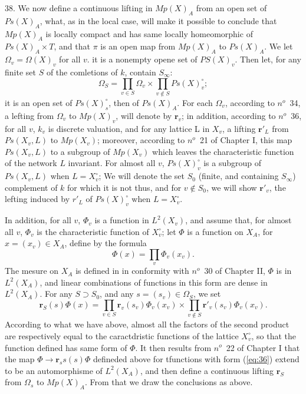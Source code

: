 \documentclass[12pt]{amsart}
\def\br{{\mathbf{r}}}
\newcounter{ssection}
\renewcommand{\subsection}{
  \addtocounter{ssection}{1}{\bf  \arabic{ssection}.\  }}
\begin{document}
\subsection{}
38.  We now define a continuous lifting in $Mp(X)_A$ from an open set of 
$Ps(X)_A$,
what, as in the local case, will make it possible to conclude that $Mp(X)_A$ 
is locally compact and has same locally homeomorphic of $Ps(X)_A \times T$,
and that $\pi$ is 
an open map from $Mp(X)_A$ to  $Ps(X)_A$.
We let $\Omega_v = \Omega(X)_v$ for all $v$. 
it is a nonempty opene set of $PS(X)_v$. Then let, for any finite set $S$ of
the comletions of $k$, contain $S_\infty$:
\[
\Omega_S=\prod_{v\in S} \Omega_v \times \prod_{v\notin S} Ps(X)_v^\circ;
\] 
it is an open set of $Ps(X)_s^\circ$, then of $Ps(X)_A$. For each $\Omega_v$, 
according to $n^o$~34, a lefting from $\Omega_v$ to $Mp(X)_v$, will denote by 
$\br_v$; in addition, according to $n^o$~36, for all $v$, $k_v$ is discrete valuation, and for any lattice L in $X_v$, a lifting $\br'_L$ from $Ps(X_v,L)$ to
$Mp(X_v)$; moreover, according to $n^o$~21 of Chapter I, 
this map $Ps(X_v, L)$ to a subgroup of $Mp(X_v)$ which leaves 
the characteristic function of the network $L$ invariant.
For almost all $v$, $Ps(X)_v^\circ$ is a subgroup of $Ps(X_v,L)$
 when $L =X_v^\circ$; We will denote the set $S_0$ 
(finite, and containing $S_\infty$) complement of $k$ for which it is not thus,
and for $v\notin S_0$, we will show $\br'_v$, the lefting induced by $r'_L$ of
$Ps(X)_v^\circ$ when $L=X_v^\circ$.

In addition, for all $v$, $\Phi_v$ is a function in  $L^2(X_v)$,
and assume that, for almost all $v$, $\Phi_v$ 
is the characteristic function of $X_v^\circ$; let $\Phi$ is a function on $X_A$,
for $x=(x_v)\in X_A$, define by the formula
\begin{equation}\label{eq:36}
\Phi(x) = \prod_v \Phi_v(x_v).
\end{equation}
The mesure on $X_A$ is defined in in conformity with $n^o$~30 of Chapter II,
$\Phi$ is in $L^2(X_A)$, and linear combinations of  functions in this 
form are dense in $L^2(X_A)$.
For any $S\supset S_0$, and any $s=(s_v)\in \Omega_S$, we set
\[
\br_S(s)\Phi(x) = \prod_{v\in S} \br_v(s_v)\Phi_v(x_v) 
\times \prod_{v\notin S} \br'_v(s_v)\Phi_v(x_v).
\]
According to what we have above,
almost all the factors of the second product are
respectively equal to the caractdristic functions of the lattice $X_v^\circ$,
so that the function defined has same form of $\Phi$.
It then results from $n^o$~22 of Chapter I that 
the map $\Phi\to \br_ss(s)\Phi$ defineded above for tfunctions 
with form (\ref{eq:36}) extend to be an automorphisme of $L^2(X_A)$, and 
then define a continuous lifting $\br_S$ from $\Omega_s$ to $Mp(X)_A$.
From that we draw the conclusions as above.  
\end{document}
